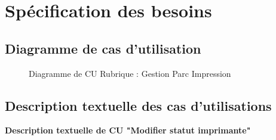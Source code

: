 \documentclass[a4paper,11pt]{report}
\begin{document}
\section{Spécification des besoins}
\subsection{Diagramme de cas d’utilisation }

\begin{figure}[H]
  \centering
  \caption{Diagramme de CU Rubrique : Gestion Parc Impression}
  \label{fig:clone-result}
\end{figure}          

\subsection{Description textuelle des cas d’utilisations }

\textbf{Description textuelle de CU "Modifier statut imprimante"}
\end{document}
